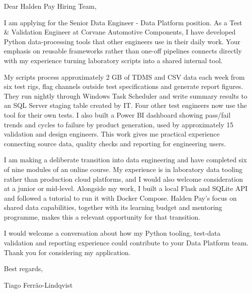 \documentclass[11pt,a4paper]{article}
\begin{document}
Dear Halden Pay Hiring Team,

I am applying for the Senior Data Engineer - Data Platform position. As a Test \& Validation Engineer at Corvane Automotive Components, I have developed Python data-processing tools that other engineers use in their daily work. Your emphasis on reusable frameworks rather than one-off pipelines connects directly with my experience turning laboratory scripts into a shared internal tool.

My scripts process approximately 2 GB of TDMS and CSV data each week from six test rigs, flag channels outside test specifications and generate report figures. They run nightly through Windows Task Scheduler and write summary results to an SQL Server staging table created by IT. Four other test engineers now use the tool for their own tests. I also built a Power BI dashboard showing pass/fail trends and cycles to failure by product generation, used by approximately 15 validation and design engineers. This work gives me practical experience connecting source data, quality checks and reporting for engineering users.

I am making a deliberate transition into data engineering and have completed six of nine modules of an online course. My experience is in laboratory data tooling rather than production cloud platforms, and I would also welcome consideration at a junior or mid-level. Alongside my work, I built a local Flask and SQLite API and followed a tutorial to run it with Docker Compose. Halden Pay's focus on shared data capabilities, together with its learning budget and mentoring programme, makes this a relevant opportunity for that transition.

I would welcome a conversation about how my Python tooling, test-data validation and reporting experience could contribute to your Data Platform team. Thank you for considering my application.

Best regards,\par
Tiago Ferrão-Lindqvist
\end{document}
